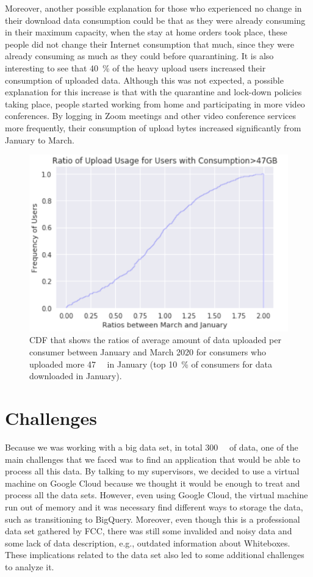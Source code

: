 \documentclass[conference,10pt]{IEEEtran}
\begin{document}
Moreover, another possible explanation for those who experienced no change in their download data consumption could be that as they were already consuming in their maximum capacity, when the stay at home orders took place, these people did not change their Internet consumption that much, since they were already consuming as much as they could before quarantining. It is also interesting to see that \SI{40}{\percent} of the heavy upload users increased their consumption of uploaded data. Although this was not expected, a possible explanation for this increase is that with the quarantine and lock-down policies taking place, people started working from home and participating in more video conferences. By logging in Zoom meetings and other video conference services more frequently, their consumption of upload bytes increased significantly from January to March.
\begin{figure}
\centering
\includegraphics[width=1.0\linewidth]{figs/heavyup.PNG}
\caption{CDF that shows the ratios of average amount of data uploaded per consumer between January and March 2020 for consumers who uploaded more \SI{47}{\giga\byte} in January (top \SI{10}{\percent} of consumers for data downloaded in January).}
\label{fig:heavyup}
\end{figure}

\section{Challenges}
\label{sec:challenges}
Because we was working with a big data set, in total \SI{300}{\giga\byte} of data, one of the main challenges that we faced was to find an application that would be able to process all this data. By talking to my supervisors, we decided to use a virtual machine on Google Cloud because we thought it would be enough to treat and process all the data sets. However, even using Google Cloud, the virtual machine run out of memory and it was necessary find different ways to storage the data, such as transitioning to BigQuery. Moreover, even though this is a professional data set gathered by FCC, there was still some invalided and noisy data and some lack of data description, e.g., outdated information about Whiteboxes. These implications related to the data set also led to some additional challenges to analyze it.
\end{document}
